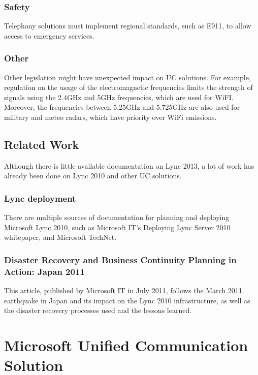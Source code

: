 \subsection{Safety}
Telephony solutions must implement regional standards, such as E911, to allow access to emergency services\cite{_voip_????}.

\subsection{Other}
Other legislation might have unexpected impact on UC solutions. For example, regulation on the usage of the electromagnetic frequencies limits the strength of signals using the 2.4GHz and 5GHz frequencies, which are used for WiFI. Moreover, the frequencies between 5.25GHz and 5.725GHz are also used for military and meteo radars, which have priority over WiFi emissions\cite{arcep_reseaux_????}.


\section{Related Work}

Although there is little available documentation on Lync 2013, a lot of work has already been done on Lync 2010 and other UC solutions.

\subsection{Lync deployment}
There are multiple sources of documentation for planning and deploying Microsoft Lync 2010, such as Microsoft IT's Deploying Lync Server 2010 whitepaper\cite{microsoft_it_showcase_deploying_2011}, and Microsoft TechNet\cite{microsoft_technet_microsoft_2013}.


\subsection{Disaster Recovery and Business Continuity Planning in Action: Japan 2011}
This article, published by Microsoft IT in July 2011, follows the March 2011 earthquake in Japan and its impact on the Lync 2010 infrastructure, as well as the disaster recovery processes used and the lessons learned\cite{microsoft_it_showcase_disaster_2011}.


\chapter{Microsoft Unified Communication Solution}\label{chapter_ms_UC}

